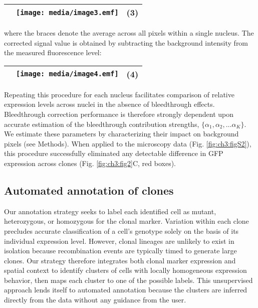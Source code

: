 \begin{longtable}[]{@{}lll@{}}
\toprule
& \texttt{[image: media/image3.emf]} & (\protect\hypertarget{GLM}{}{}3)\tabularnewline
\bottomrule
\end{longtable}

where the braces denote the average across all pixels within a single nucleus. The corrected signal value is obtained by subtracting the background intensity from the measured fluorescence level:

\begin{longtable}[]{@{}lll@{}}
\toprule
& \texttt{[image: media/image4.emf]} & (4)\tabularnewline
\bottomrule
\end{longtable}

Repeating this procedure for each nucleus facilitates comparison of relative expression levels across nuclei in the absence of bleedthrough effects. Bleedthrough correction performance is therefore strongly dependent upon accurate estimation of the bleedthrough contribution strengths, $\{\alpha_1, \alpha_2, \ldots \alpha_K\}$. We estimate these parameters by characterizing their impact on background pixels (see Methods). When applied to the microscopy data (Fig. \ref{fig:ch3:figS2}), this procedure successfully eliminated any detectable difference in GFP expression across clones (Fig. \ref{fig:ch3:fig2}C, red boxes).

\subsection{Automated annotation of clones}

Our annotation strategy seeks to label each identified cell as mutant, heterozygous, or homozygous for the clonal marker. Variation within each clone precludes accurate classification of a cell's genotype solely on the basis of its individual expression level. However, clonal lineages are unlikely to exist in isolation because recombination events are typically timed to generate large clones. Our strategy therefore integrates both clonal marker expression and spatial context to identify clusters of cells with locally homogeneous expression behavior, then maps each cluster to one of the possible labels. This unsupervised approach lends itself to automated annotation because the clusters are inferred directly from the data without any guidance from the user.

